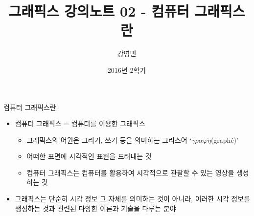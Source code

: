\documentclass{beamer}
\title[3D 그래픽스 프로그래밍]{그래픽스 강의노트 02 - 컴퓨터 그래픽스란}
\author{강영민}
\institute{동명대학교}
\date{2016년 2학기}
\begin{document}
\begin{frame}
  \titlepage
\end{frame}




\begin{frame}{컴퓨터 그래픽스란}
\begin{itemize}
\item 컴퓨터 그래픽스 = 컴퓨터를 이용한 그래픽스
	\begin{itemize}
	\item 그래픽스의 어원은 그리기, 쓰기 등을 의미하는 그리스어  ‘$\gamma\rho\alpha\varphi\acute{\eta}$(graph\'{e})’
	\item 어떠한 표면에 시각적인 표현을 드러내는 것
	\item 컴퓨터 그래픽스는 컴퓨터를 활용하여 시각적으로 관찰할 수 있는 영상을 생성하는 것
	\end{itemize}
\item 그래픽스는 단순히 시각 정보 그 자체를 의미하는 것이 아니라, 이러한 시각 정보를 생성하는 것과 관련된 다양한 이론과 기술을 다루는 분야
\end{itemize}
\end{frame}
\end{document}
